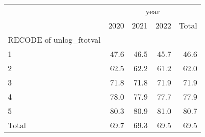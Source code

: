\begin{tabular}{lllll}
\cline{1-5}
\multicolumn{1}{c}{} &
  \multicolumn{4}{|c}{year} \\
\multicolumn{1}{c}{} &
  \multicolumn{1}{|r}{2020} &
  \multicolumn{1}{r}{2021} &
  \multicolumn{1}{r}{2022} &
  \multicolumn{1}{r}{Total} \\
\cline{1-5}
\multicolumn{1}{l}{RECODE of unlog\_ftotval} &
  \multicolumn{1}{|r}{} &
  \multicolumn{1}{r}{} &
  \multicolumn{1}{r}{} &
  \multicolumn{1}{r}{} \\
\multicolumn{1}{l}{\hspace{1em}1} &
  \multicolumn{1}{|r}{47.6} &
  \multicolumn{1}{r}{46.5} &
  \multicolumn{1}{r}{45.7} &
  \multicolumn{1}{r}{46.6} \\
\multicolumn{1}{l}{\hspace{1em}2} &
  \multicolumn{1}{|r}{62.5} &
  \multicolumn{1}{r}{62.2} &
  \multicolumn{1}{r}{61.2} &
  \multicolumn{1}{r}{62.0} \\
\multicolumn{1}{l}{\hspace{1em}3} &
  \multicolumn{1}{|r}{71.8} &
  \multicolumn{1}{r}{71.8} &
  \multicolumn{1}{r}{71.9} &
  \multicolumn{1}{r}{71.9} \\
\multicolumn{1}{l}{\hspace{1em}4} &
  \multicolumn{1}{|r}{78.0} &
  \multicolumn{1}{r}{77.9} &
  \multicolumn{1}{r}{77.7} &
  \multicolumn{1}{r}{77.9} \\
\multicolumn{1}{l}{\hspace{1em}5} &
  \multicolumn{1}{|r}{80.3} &
  \multicolumn{1}{r}{80.9} &
  \multicolumn{1}{r}{81.0} &
  \multicolumn{1}{r}{80.7} \\
\multicolumn{1}{l}{\hspace{1em}Total} &
  \multicolumn{1}{|r}{69.7} &
  \multicolumn{1}{r}{69.3} &
  \multicolumn{1}{r}{69.5} &
  \multicolumn{1}{r}{69.5} \\
\cline{1-5}
\end{tabular}
